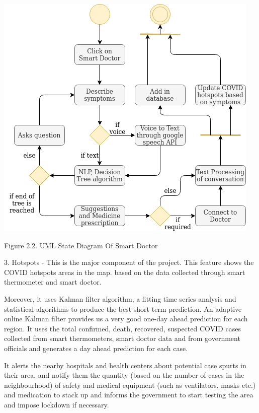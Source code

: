 \documentclass[10pt,twocolumn,letterpaper]{article}
\begin{document}
\begin{center}
\includegraphics[width=1\linewidth]{uml_state_diagram.png}
\caption{Figure 2.2. UML State Diagram Of Smart Doctor}
\end{center}


3. Hotspots - This is the major component of the project. This feature shows the COVID hotspots areas in the map. based on the data collected through smart thermometer and smart doctor.~\cite{smart-thermometer}


Moreover, it uses Kalman filter algorithm, a fitting time series analysis and statistical algorithms to produce the best short term prediction. An adaptive online Kalman filter provides us a very good one-day ahead prediction for each region. It uses the total  confirmed, death, recovered, suspected COVID cases collected from smart thermometers, smart doctor data and from government officials and generates a day ahead prediction for each case.~\cite{kalman-filter}


It alerts the nearby hospitals and health centers about potential case spurts in their area, and notify them the quantity (based on the number of cases in the neighbourhood) of safety and medical equipment (such as ventilators, masks etc.) and medication to stack up and informs the government to start testing the area and impose lockdown if necessary.
\end{document}
